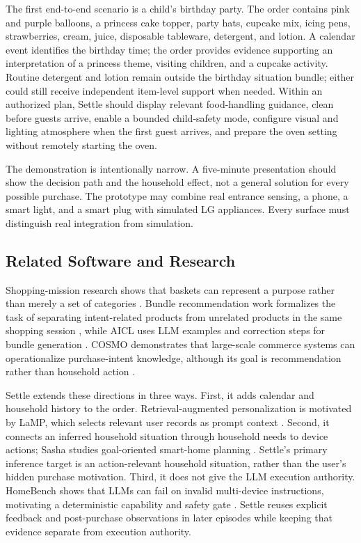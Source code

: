 \documentclass[conference]{IEEEtran}
\begin{document}
The first end-to-end scenario is a child's birthday party. The order contains pink and purple balloons, a princess cake topper, party hats, cupcake mix, icing pens, strawberries, cream, juice, disposable tableware, detergent, and lotion. A calendar event identifies the birthday time; the order provides evidence supporting an interpretation of a princess theme, visiting children, and a cupcake activity. Routine detergent and lotion remain outside the birthday situation bundle; either could still receive independent item-level support when needed. Within an authorized plan, Settle should display relevant food-handling guidance, clean before guests arrive, enable a bounded child-safety mode, configure visual and lighting atmosphere when the first guest arrives, and prepare the oven setting without remotely starting the oven.

The demonstration is intentionally narrow. A five-minute presentation should show the decision path and the household effect, not a general solution for every possible purchase. The prototype may combine real entrance sensing, a phone, a smart light, and a smart plug with simulated LG appliances. Every surface must distinguish real integration from simulation.

\subsection{Related Software and Research}

Shopping-mission research shows that baskets can represent a purpose rather than merely a set of categories \cite{shopping}. Bundle recommendation work formalizes the task of separating intent-related products from unrelated products in the same shopping session \cite{bundle}, while AICL uses LLM examples and correction steps for bundle generation \cite{aicl}. COSMO demonstrates that large-scale commerce systems can operationalize purchase-intent knowledge, although its goal is recommendation rather than household action \cite{cosmo}.

Settle extends these directions in three ways. First, it adds calendar and household history to the order. Retrieval-augmented personalization is motivated by LaMP, which selects relevant user records as prompt context \cite{lamp}. Second, it connects an inferred household situation through household needs to device actions; Sasha studies goal-oriented smart-home planning \cite{sasha}. Settle's primary inference target is an action-relevant household situation, rather than the user's hidden purchase motivation. Third, it does not give the LLM execution authority. HomeBench shows that LLMs can fail on invalid multi-device instructions, motivating a deterministic capability and safety gate \cite{homebench}. Settle reuses explicit feedback and post-purchase observations in later episodes while keeping that evidence separate from execution authority.
\end{document}

